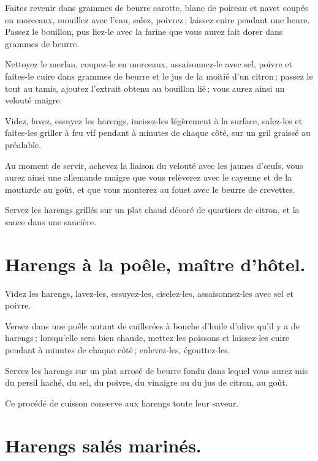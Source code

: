 Faites revenir dans {\mmm} grammes de beurre carotte, blanc de poireau et
navet coupés en morceaux, mouillez avec l'eau, salez, poivrez ; laissez cuire
pendant une heure. Passez le bouillon, pus liez-le avec la farine que vous
aurez fait dorer dans {\mmm} grammes de beurre.

Nettoyez le merlan, coupez-le en morceaux, assaisonnez-le avec sel, poivre et
faites-le cuire dans {\mmm} grammes de beurre et le jus de la moitié d'un
citron ; passez le tout au tamis, ajoutez l'extrait obtenu au bouillon lié ;
vous aurez ainsi un velouté maigre.

Videz, lavez, essuyez les harengs, incisez-les légèrement à la surface,
salez-les et faites-les griller à feu vif pendant {\mmm} à {\mmm}
minutes de chaque côté, sur un gril graissé au préalable.

Au moment de servir, achevez la liaison du velouté avec les jaunes d'œufs,
vous aurez ainsi une allemande maigre que vous relèverez avec le cayenne et de
la moutarde au goût, et que vous monterez au fouet avec le beurre de crevettes.

Servez les harengs grillés sur un plat chaud décoré de quartiers de citron, et
la sauce dans une saucière.

\section*{\centering Harengs à la poêle, maître d'hôtel.}

Videz les harengs, lavez-les, essuyez-les, ciselez-les, assaisonnez-les avec
sel et poivre.

Versez dans une poêle autant de cuillerées à bouche d'huile d'olive qu'il
y a de harengs ; lorsqu'elle sera bien chaude, mettez les poissons et laissez-les cuire
pendant {\mmm} à {\mmm} minutes de chaque côté ; enlevez-les, égouttez-les.

Servez les harengs sur un plat arrosé de beurre fondu dans lequel vous aurez
mis du persil haché, du sel, du poivre, du vinaigre ou du jus de citron, au goût.

Ce procédé de cuisson conserve aux harengs toute leur saveur.

\section*{\centering Harengs salés marinés.}

